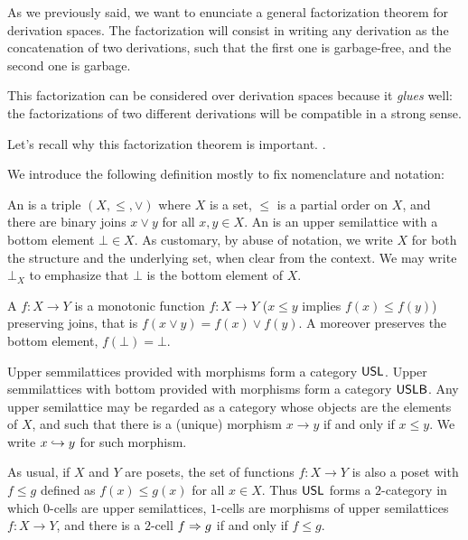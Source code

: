 
As we previously said, we want to enunciate a general
factorization theorem for derivation spaces.
The factorization will consist in writing any derivation as
the concatenation of two derivations, such that the first one is garbage-free,
and the second one is garbage.

This factorization can be considered over derivation spaces because
it \emph{glues} well: the factorizations of two different derivations will
be compatible in a strong sense.

Let's recall why this factorization theorem is important.
.


We introduce the following definition mostly to fix nomenclature and notation:

\begin{definition}
An  is a triple $(X,\leq,\lor)$
where $X$ is a set, $\leq$ is a partial order on $X$,
and there are binary joins $x \lor y$ for all $x, y \in X$.
An  is an upper semilattice
with a bottom element $\bot \in X$.
As customary, by abuse of notation, we write $X$ for both the structure
and the underlying set, when clear from the context.
We may write $\bot_X$ to emphasize that $\bot$ is the bottom element of $X$.

A  $f : X \to Y$
is a monotonic function $f : X \to Y$
(\ie $x \leq y$ implies $f(x) \leq f(y)$)
preserving joins,
that is $f(x \lor y) = f(x) \lor f(y)$.
A 
moreover preserves the bottom element, \ie $f(\bot) = \bot$.

Upper semmilattices provided with morphisms form a category $\USL$.
Upper semmilattices with bottom provided with morphisms form a category $\USLB$.
Any upper semilattice may be regarded as a category
whose objects are the elements of $X$, and such that there is a (unique) morphism
$x \to y$ if and only if $x \leq y$.
We write $\pt{y}{x}$ for such morphism.

As usual, if $X$ and $Y$ are posets, the set of functions $f : X \to Y$
is also a poset with $f \leq g$ defined as $f(x) \leq g(x)$ for all $x \in X$.
Thus $\USL$ forms a $2$-category
in which $0$-cells are upper semilattices,
$1$-cells are morphisms of upper semilattices $f : X \to Y$, 
and there is a $2$-cell $f \totwo g$ if and only if $f \leq g$.
\end{definition}

